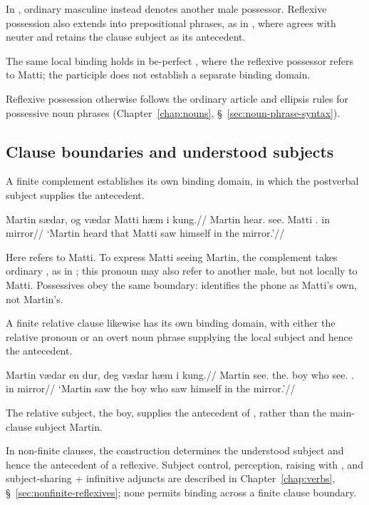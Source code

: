 In , ordinary masculine  instead denotes another male possessor. Reflexive possession also extends into prepositional phrases, as in , where  agrees with neuter  and retains the clause subject as its antecedent.

The same local binding holds in be-perfect , where the reflexive possessor refers to Matti; the participle does not establish a separate binding domain.

Reflexive possession otherwise follows the ordinary article and ellipsis rules for possessive noun phrases (Chapter~\ref{chap:nouns}, \S~\ref{sec:noun-phrase-syntax}).

\subsection{Clause boundaries and understood subjects}
\label{sec:reflexive-domains}

A finite  complement establishes its own binding domain, in which the postverbal subject supplies the antecedent.

\pex
\begingl
\gla Martin sædar, og vædar Matti hæm i kung.//
\glb Martin hear.\Pst{} \Cmpl{} see.\Pst{} Matti \Refl{}.\Acc{} in mirror//
\glft `Martin heard that Matti saw himself in the mirror.'//
\endgl
\xe

Here  refers to Matti. To express Matti seeing Martin, the complement takes ordinary , as in ; this pronoun may also refer to another male, but not locally to Matti. Possessives obey the same boundary:  identifies the phone as Matti's own, not Martin's.

A finite relative clause likewise has its own binding domain, with either the relative pronoun or an overt noun phrase supplying the local subject and hence the antecedent.

\pex
\begingl
\gla Martin vædar en dur, deg vædar hæm i kung.//
\glb Martin see.\Pst{} the.\M{} boy who see.\Pst{} \Refl{}.\Acc{} in mirror//
\glft `Martin saw the boy who saw himself in the mirror.'//
\endgl
\xe

The relative subject, the boy, supplies the antecedent of , rather than the main-clause subject Martin.

In non-finite clauses, the construction determines the understood subject and hence the antecedent of a reflexive. Subject control, perception, raising with , and subject-sharing  + infinitive adjuncts are described in Chapter~\ref{chap:verbs}, \S~\ref{sec:nonfinite-reflexives}; none permits binding across a finite clause boundary.

